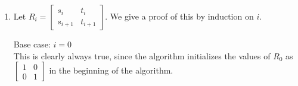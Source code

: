 \documentclass[11pt,a4paper]{article}
\begin{document}
\begin{enumerate}
\begin{enumerate}
\begin{align*}
\begin{bmatrix}
			                                                                        \end{bmatrix}
			            \intertext{The Extended Euclidean algorithm defines $r_{i + 2}$ as $r_{i} - q_{i + 1}r_{i + 1}$. Thus:}
			            R_{i + 1}\begin{bmatrix}
				                     f                  \\ g                   \end{bmatrix} & = \begin{bmatrix}
				                                                                                 r_{i + 1} \\ r_{i + 2}
			                                                                                 \end{bmatrix}
		            \end{align*}
		            We have concluded that the base case holds, and that the next step $i + 1$ holds if the general case $i$ holds,
		            thus the statement is true by mathematical induction.

		            \newpage

		      \item Let $R_i = \begin{bmatrix}
				            s_i & t_i \\ s_{i + 1} & t_{i + 1}
			            \end{bmatrix}$. We give a proof of this by induction on $i$.

		            Base case: $i = 0$ \\
		            This is clearly always true, since the algorithm initializes the values of $R_0$ as $\begin{bmatrix}
				            1 & 0 \\ 0 & 1
			            \end{bmatrix}$ in the beginning of the algorithm.


\end{enumerate}
\end{enumerate}
\end{document}
